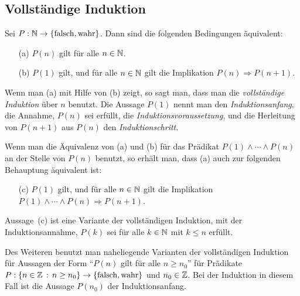 
\begin{appendices}

\section{Vollständige Induktion}

\begin{framed} 
Sei $P : \mathbb N \to \{ \operatorname{falsch}, \operatorname{wahr} \}$. Dann sind die folgenden Bedingungen äquivalent:
  \begin{itemize}
  	\item[(a)] $P(n)$ gilt für alle $n \in \mathbb N$.
  	\item[(b)] $P(1)$ gilt, und für alle $n \in \mathbb N$ gilt die Implikation $P(n) \Rightarrow P(n+1)$. 
  \end{itemize} 
\end{framed} 

Wenn man (a) mit Hilfe von (b) zeigt, so sagt man, dass man die \emph{vollständige Induktion} über $n$ benutzt. Die Aussage $P(1)$ nennt man den \emph{Induktionsanfang}, die Annahme, $P(n)$ sei erfüllt, die \emph{Induktionsvoraussetzung}, und die Herleitung von $P(n+1)$ aus $P(n)$ den \emph{Induktionschritt}. 

Wenn man die Äquivalenz von (a) und (b) für das Prädikat $P(1) \wedge \cdots \wedge P(n)$ an der Stelle von $P(n)$ benutzt, so erhält man, dass (a) auch zur folgenden Behauptung äquivalent ist: 

\begin{itemize}
	\item[(c)] $P(1)$ gilt, und für alle $n \in \mathbb N$ gilt die Implikation $P(1) \wedge \cdots \wedge P(n) \Rightarrow P(n+1)$. 
\end{itemize} 

Aussage~(c) ist eine Variante der vollständigen Induktion, mit der Induktionsannahme, $P(k)$ sei für alle $k \in \mathbb N$ mit $k \le n$ erfüllt. 

Des Weiteren benutzt man naheliegende Varianten der vollständigen Induktion für Aussagen der Form ``$P(n)$ gilt für alle $n \ge n_0$'' für Prädikate $P : \{ n \in \mathbb Z \,:\, n \ge n_0\} \to \{ \operatorname{falsch}, \operatorname{wahr} \}$ und $n_0 \in \mathbb Z$. Bei der Induktion in diesem Fall ist die Aussage $P(n_0)$ der Induktionsanfang. 


\end{appendices}
